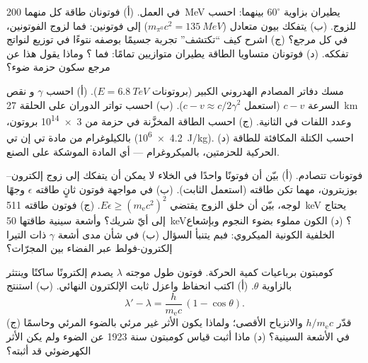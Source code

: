 \begin{exercise}[$\star\star$]\label{exo:b3:relativistic-dynamics:7}
 في العمل. (أ) فوتونان طاقة كل منهما \qty{200}{MeV} يطيران
بزاوية $60^\circ$ بينهما: احسب  للزوج.
(ب) يتفكك بيون متعادل ($m_{\pi^0}c^2 = \qty{135}{MeV}$) إلى
فوتونين: فما  لزوج الفوتونين، في كل
مرجع؟ (ج) اشرح كيف ``تكتشف'' تجربة جسيمًا بوصفه نتوءًا
في توزيع  لنواتج تفككه. (د)
فوتونان متساويا الطاقة يطيران متوازيين تمامًا: فما ؟
وماذا يقول هذا عن مرجع سكون حزمة ضوء؟
\end{exercise}

\begin{exercise}[$\star\star$]\label{exo:b3:relativistic-dynamics:8}
مسك دفاتر المصادم الهدروني الكبير (بروتونات $E = \qty{6.8}{TeV}$). (أ) احسب $\gamma$ و
نقص السرعة $c - v$ (استعمل $c - v \approx c/2\gamma^2$). (ب) احسب
تواتر الدوران على الحلقة \qty{27}{km} وعدد اللفات
في الثانية. (ج) احسب الطاقة المخزَّنة في حزمة من \num{3e14} بروتون، بالكيلوغرام
من مادة تي إن تي (\qty{4.2e6}{J/kg}). (د) احسب الكتلة المكافئة
للطاقة الحركية للحزمتين، بالميكروغرام --- أي المادة الموشكة على الصنع.
\end{exercise}

\begin{exercise}[$\star\star$]\label{exo:b3:relativistic-dynamics:9}
فوتونات تتصادم. (أ) بيّن أن فوتونًا واحدًا في الخلاء لا يمكن أن
يتفكك إلى زوج إلكترون--بوزيترون، مهما تكن طاقته (استعمل
الثابت). (ب) في مواجهة فوتون ثانٍ طاقته $\epsilon$ وجهًا لوجه،
بيّن أن خلق الزوج يقتضي $E\epsilon \ge (m_{\text{e}}c^2)^2$. (ج) فوتون
طاقته \qty{511}{keV} يحتاج إلى أيّ شريك؟ وأشعة سينية طاقتها \qty{50}{keV}؟
(د) الكون مملوء بضوء النجوم وبإشعاع الخلفية الكونية
الميكروي: فبم يتنبأ السؤال (ب) في شأن مدى أشعة $\gamma$ ذات
التيرا إلكترون-فولط عبر الفضاء بين المجرّات؟
\end{exercise}

\begin{exercise}[$\star\star\star$]\label{exo:b3:relativistic-dynamics:10}
كومبتون برباعيات كمية الحركة. فوتون طول موجته $\lambda$ يصدم
إلكترونًا ساكنًا وينتثر بالزاوية $\theta$. (أ) اكتب
انحفاظ  واعزل ثابت الإلكترون
النهائي. (ب) استنتج
\[
\lambda' - \lambda = \frac{h}{m_{\text{e}}c}\,(1 - \cos\theta) .
\]
(ج) قدّر $h/m_{\text{e}}c$ والانزياح الأقصى؛ ولماذا يكون
الأثر غير مرئي بالضوء المرئي وحاسمًا في الأشعة السينية؟ (د)
ماذا أثبت قياس كومبتون سنة 1923 عن الضوء ولم يكن الأثر
الكهرضوئي قد أثبته؟
\end{exercise}

